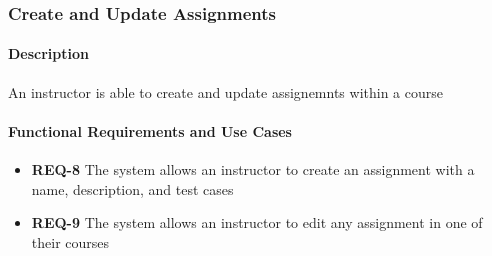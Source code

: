 \documentclass{article}
\begin{document}
\subsubsection{Create and Update Assignments}

\paragraph{Description} An instructor is able to create and update assignemnts within a course

\paragraph{Functional Requirements and Use Cases}

\begin{itemize}
  \item \textbf{REQ-8} The system allows an instructor to create an assignment with a name, description, and test cases
  \item \textbf{REQ-9} The system allows an instructor to edit any assignment in one of their courses
\end{itemize}

\vspace{0.2in}
\end{document}
